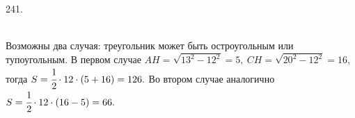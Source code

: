 241. \begin{figure}[ht!]
\end{figure}\\
Возможны два случая: треугольник может быть остроугольным или тупоугольным. В первом случае $AH=\sqrt{13^2-12^2}=5,\ CH=\sqrt{20^2-12^2}=16,$ тогда $S=\cfrac{1}{2}\cdot12\cdot(5+16)=126.$ Во втором случае аналогично $S=\cfrac{1}{2}\cdot12\cdot(16-5)=66.$\\
